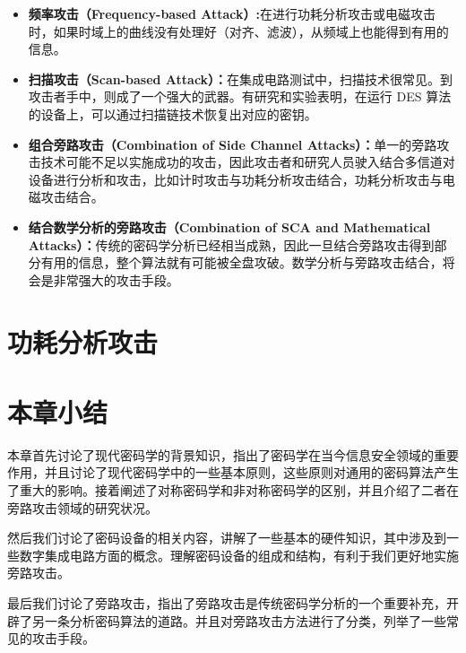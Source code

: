 \begin{itemize}
\item \textbf{频率攻击（Frequency-based Attack）:}在进行功耗分析攻击或电磁攻击时，如果时域上的曲线没有处理好（对齐、滤波），从频域上也能得到有用的信息。
\item \textbf{扫描攻击（Scan-based Attack）：}在集成电路测试中，扫描技术很常见。到攻击者手中，则成了一个强大的武器。有研究和实验表明，在运行 DES 算法的设备上，可以通过扫描链技术恢复出对应的密钥。
\item \textbf{组合旁路攻击（Combination of Side Channel Attacks）：}单一的旁路攻击技术可能不足以实施成功的攻击，因此攻击者和研究人员驶入结合多信道对设备进行分析和攻击，比如计时攻击与功耗分析攻击结合，功耗分析攻击与电磁攻击结合。
\item \textbf{结合数学分析的旁路攻击（Combination of SCA and Mathematical Attacks）：}传统的密码学分析已经相当成熟，因此一旦结合旁路攻击得到部分有用的信息，整个算法就有可能被全盘攻破。数学分析与旁路攻击结合，将会是非常强大的攻击手段。

\end{itemize}

\section{功耗分析攻击}





\section{本章小结}

本章首先讨论了现代密码学的背景知识，指出了密码学在当今信息安全领域的重要作用，并且讨论了现代密码学中的一些基本原则，这些原则对通用的密码算法产生了重大的影响。接着阐述了对称密码学和非对称密码学的区别，并且介绍了二者在旁路攻击领域的研究状况。

然后我们讨论了密码设备的相关内容，讲解了一些基本的硬件知识，其中涉及到一些数字集成电路方面的概念。理解密码设备的组成和结构，有利于我们更好地实施旁路攻击。

最后我们讨论了旁路攻击，指出了旁路攻击是传统密码学分析的一个重要补充，开辟了另一条分析密码算法的道路。并且对旁路攻击方法进行了分类，列举了一些常见的攻击手段。





